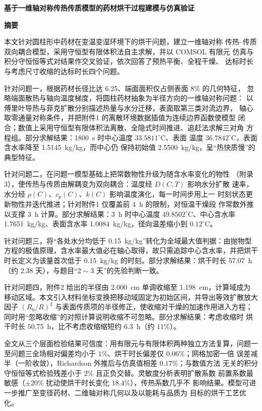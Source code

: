\documentclass[12pt,a4paper]{article}
\begin{document}
\linespread{1.05}\selectfont


\setcounter{page}{1}

\begin{center}
{\bfseries 基于一维轴对称传热传质模型的药材烘干过程建模与仿真验证}


\vspace{2ex}
{\bfseries 摘\quad 要}
\end{center}

\noindent 本文针对圆柱形中药材在变温变湿环境下的烘干问题，建立一维轴对称
传热--传质双向耦合模型，采用守恒型有限体积法自主求解，并以 COMSOL 有限元
仿真与积分守恒恒等式对结果作交叉验证，依次回答了预热平衡、全程干燥、
达标时长与考虑尺寸收缩的达标时长四个问题。

针对问题一，根据药材长径比达 6.25、端面面积仅占侧表面 $8\%$ 的几何特征，
忽略端面散热与轴向温度梯度，将圆柱药材抽象为半径方向的一维轴对称问题：
以傅里叶导热与菲克扩散分别描述热量与水分迁移，表面取第三类对流边界，
轴心取零通量对称条件，并把附件1 的离散环境数据插值为连续边界函数使模型
闭合；数值上采用守恒型有限体积法离散、全隐式时间推进、追赶法求解三对角
方程组。部分求解结果：1800~s 时中心温度 $33.5811^\circ\mathrm{C}$、表面
温度 $36.7842^\circ\mathrm{C}$，表面含水率降至 1.5145~kg/kg，而中心仍
保持初始值 2.5500~kg/kg，呈``热快质慢''的典型特征。

针对问题二，在问题一模型基础上把常数物性升级为随含水率变化的物性
（附录3），使传热与传质由解耦变为双向耦合：温度经 $D(C,T)$ 影响水分扩散
速率，水分经 $\rho(C)$、$c_p(C)$、$k(C)$ 影响温度演化，每一时间步用上一
时刻状态更新物性并迭代推进；针对附件1 仅覆盖前 4~h 的限制，对恒温干燥段
作常数外推以支撑 3~h 计算。部分求解结果：3~h 时中心温度
$49.8502^\circ\mathrm{C}$、中心含水率 1.7651~kg/kg、表面含水率
1.0084~kg/kg，径向温差缩小到 $0.12^\circ\mathrm{C}$。

针对问题三，将``各处水分均低于 0.15~kg/kg''转化为全域最大值判据：由抛物型
方程的极值原理，含水率最大值必在轴心取得，故只需追踪中心含水率，并把烘干
时长定义为该量首次低于 0.15~kg/kg 的时刻。部分求解结果：烘干时长 57.07~h
（约 2.38 天），与题目``$2\sim3$ 天''的先验判断一致。

针对问题四，附件2 给出的半径由 2.000~cm 单调收缩至 1.198~cm，计算域成为
移动区域。本文引入材料坐标变换把移动域固定为初始区间，并导出等效扩散放大
因子 $(R_0/R)^2$ 与表面传质项的半径修正，使收缩对干燥的加速作用进入方程；
同时用``忽略收缩''的对照计算说明收缩不可忽略。部分求解结果：考虑收缩时
烘干时长 50.75~h，比不考虑收缩缩短约 6.3~h（约 $11\%$）。

全文从三个层面检验结果可信度：用有限元与有限体积两种独立方法复算，问题一
至问题三全场相对偏差均小于 $1\%$、烘干时长偏差仅 $0.06\%$；网格加密一倍
误差减半（一阶收敛），Richardson 外推后与仿真值相差 $0.17\%$；与数值方法
无关的积分守恒恒等式检验残差小于 $2\%$ 且正负交替。灵敏度分析表明扩散系数
前置系数最敏感（$\pm20\%$ 扰动使烘干时长变化 $18.4\%$），传热系数几乎不
影响结果。模型可进一步推广至变径药材、二维轴对称几何以及以能耗与品质为
目标的烘干工艺优化。
\end{document}
